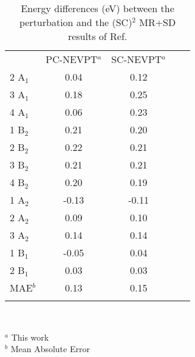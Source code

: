 \documentclass[global,referee]{svjour}
\begin{document}
\begin{table}[h]
\caption{Energy differences (eV) between the perturbation and the (SC)$^2$ MR+SD results 
of Ref. \cite{Ruiz03}}
\label{Tabforeemaeb1}
\begin{tabular}{lcccc}
\hline\noalign{\smallskip}
         & PC-NEVPT$^a$ &  SC-NEVPT$^a$   \\
2 A$_1$  &   0.04   &    0.12     \\
3 A$_1$  &   0.18   &    0.25     \\
4 A$_1$  &   0.06   &    0.23     \\
1 B$_2$  &   0.21   &    0.20     \\
2 B$_2$  &   0.22   &    0.21     \\
3 B$_2$  &   0.21   &    0.21     \\
4 B$_2$  &   0.20   &    0.19     \\
1 A$_2$  &  -0.13   &   -0.11     \\
2 A$_2$  &   0.09   &    0.10     \\
3 A$_2$  &   0.14   &    0.14     \\
1 B$_1$  &  -0.05   &    0.04     \\
2 B$_1$  &   0.03   &    0.03     \\
\noalign{\smallskip}\hline
MAE$^b$      &   0.13   &    0.15    \\
\noalign{\smallskip}\hline
\end{tabular}\\
{\smallskip}

$^a$ This work\\
$^b$ Mean Absolute Error
\end{table}
\end{document}

